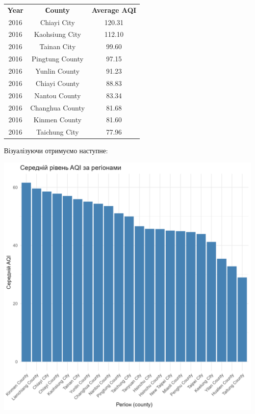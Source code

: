 \documentclass[./report.tex]{subfiles}
\begin{document}
\begin{enumerate}
  \begin{tabular}{ccc}
    \textbf{Year} & \textbf{Сounty} & \textbf{Average AQI} \\
    2016 & Chiayi City     & 120.31 \\
    2016 & Kaohsiung City  & 112.10 \\
    2016 & Tainan City     & 99.60  \\
    2016 & Pingtung County & 97.15  \\
    2016 & Yunlin County   & 91.23  \\
    2016 & Chiayi County   & 88.83  \\
    2016 & Nantou County   & 83.34  \\
    2016 & Changhua County & 81.68  \\
    2016 & Kinmen County   & 81.60  \\
    2016 & Taichung City   & 77.96  \\
  \end{tabular}

  Візуалізуючи отримуємо наступне:

  \includegraphics[width=\linewidth]{plots/question4/avg_aqi_by_country.png}


\end{enumerate}
\end{document}
